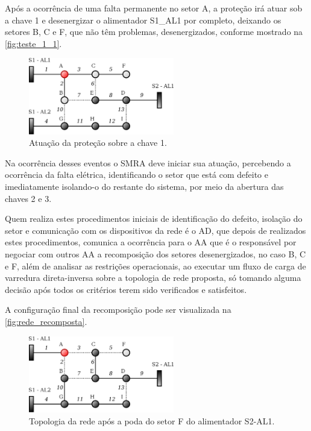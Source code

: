 \documentclass[journal]{IEEEtran}
\begin{document}
Após a ocorrência de uma falta permanente no setor A, a proteção irá atuar sob a chave 1 e desenergizar o alimentador S1\_AL1 por completo, deixando os setores B, C e F, que não têm problemas, desenergizados, conforme mostrado na \autoref{fig:teste_1_1}.

\begin{figure}[htb]
    \centering
    \includegraphics[width=2.5in]{Figuras/rede_curto_A.eps}
    \caption{\label{fig:teste_1_1} Atuação da proteção sobre a chave 1.}
\end{figure} 

Na ocorrência desses eventos o SMRA deve iniciar sua atuação, percebendo a ocorrência da falta elétrica, identificando o setor que está com defeito e imediatamente isolando-o do restante do sistema, por meio da abertura das chaves 2 e 3.

Quem realiza estes procedimentos iniciais de identificação do defeito, isolação do setor e comunicação com os dispositivos da rede é o AD, que depois de realizados estes procedimentos, comunica a ocorrência para o AA que é o responsável por negociar com outros AA a recomposição dos setores desenergizados, no caso B, C e F, além de analisar as restrições operacionais, ao executar um fluxo de carga de varredura direta-inversa sobre a topologia de rede proposta, só tomando alguma decisão após todos os critérios terem sido verificados e satisfeitos.  

A configuração final da recomposição pode ser visualizada na \autoref{fig:rede_recomposta}.

\begin{figure}[htb]
    \centering
    \includegraphics[width=2.5in]{Figuras/rede_recomposta.eps}
    \caption{\label{fig:rede_recomposta} Topologia da rede após a poda do setor F do alimentador S2-AL1.}
\end{figure}
\end{document}
